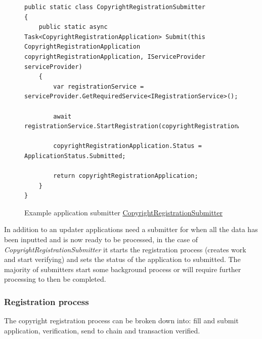 \documentclass[12pt]{article}
\begin{document}
\begin{figure}[H]
\caption{Example application submitter \href{https://github.com/MrHarrisonBarker/CRPL/blob/main/CRPL.Web/Core/Applications/Submitters/CopyrightRegistrationSubmitter.cs}{CopyrightRegistrationSubmitter}}
\centering
\begin{lstlisting}[language=CSharp]
public static class CopyrightRegistrationSubmitter
{
    public static async Task<CopyrightRegistrationApplication> Submit(this CopyrightRegistrationApplication copyrightRegistrationApplication, IServiceProvider serviceProvider)
    {
        var registrationService = serviceProvider.GetRequiredService<IRegistrationService>();
        
        await registrationService.StartRegistration(copyrightRegistrationApplication);

        copyrightRegistrationApplication.Status = ApplicationStatus.Submitted;
        
        return copyrightRegistrationApplication;
    }
}
\end{lstlisting}
\end{figure}

In addition to an updater applications need a submitter for when all the data has been inputted and is now ready to be processed, in the case of \textit{CopyrightRegistrationSubmitter} it starts the registration process (creates work and start verifying) and sets the status of the application to submitted. The majority of submitters start some background process or will require further processing to then be completed.

\subsubsection{Registration process}

The copyright registration process can be broken down into: fill and submit application, verification, send to chain and transaction verified.
\end{document}
